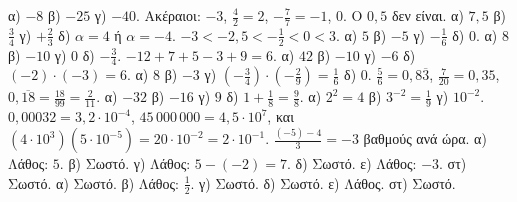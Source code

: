  α) $-8$ \quad β) $-25$ \quad γ) $-40$.
 Ακέραιοι: $-3$, $\frac{4}{2}=2$, $-\frac{7}{7}=-1$, $0$. Ο $0{,}5$ δεν είναι.
 α) $7{,}5$ \quad β) $\frac{3}{4}$ \quad γ) $+\frac{2}{3}$ \quad δ) $\alpha=4$ ή $\alpha=-4$.
 $-3<-2{,}5<-\frac{1}{2}<0<3$.
 α) $5$ \quad β) $-5$ \quad γ) $-\frac{1}{6}$ \quad δ) $0$.
 α) $8$ \quad β) $-10$ \quad γ) $0$ \quad δ) $-\frac{3}{4}$.
 $-12+7+5-3+9=6$.
 α) $42$ \quad β) $-10$ \quad γ) $-6$ \quad δ) $(-2)\cdot(-3)=6$.
 α) $8$ \quad β) $-3$ \quad γ) $\left(-\frac{3}{4}\right)\cdot\left(-\frac{2}{9}\right)=\frac{1}{6}$ \quad δ) $0$.
 $\frac{5}{6}=0{,}8\overline{3}$, $\frac{7}{20}=0{,}35$, $0{,}\overline{18}=\frac{18}{99}=\frac{2}{11}$.
 α) $-32$ \quad β) $-16$ \quad γ) $9$ \quad δ) $1+\frac{1}{8}=\frac{9}{8}$.
 α) $2^2=4$ \quad β) $3^{-2}=\frac{1}{9}$ \quad γ) $10^{-2}$.
 $0{,}00032=3{,}2\cdot10^{-4}$, $45\,000\,000=4{,}5\cdot10^{7}$, και $(4\cdot10^{3})(5\cdot10^{-5})=20\cdot10^{-2}=2\cdot10^{-1}$.
 $\frac{(-5)-4}{3}=-3$ βαθμούς ανά ώρα.
 α) Λάθος: $5$. β) Σωστό. γ) Λάθος: $5-(-2)=7$. δ) Σωστό. ε) Λάθος: $-3$. στ) Σωστό.
 α) Σωστό. β) Λάθος: $\frac{1}{2}$. γ) Σωστό. δ) Σωστό. ε) Λάθος. στ) Σωστό.
